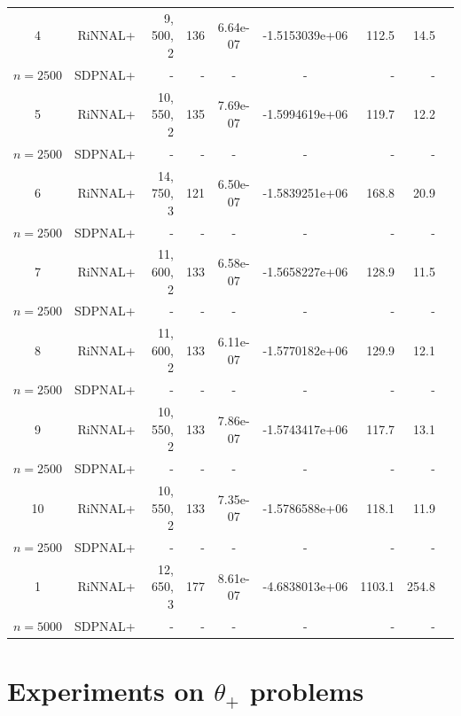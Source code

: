 \documentclass[11pt]{article}
\theoremstyle{plain}
\begin{document}
\begin{footnotesize}
\begin{longtable}[c]{crrrccrrr}
4& RiNNAL+ & 9, 500, 2 & 136 & 6.64e-07 & -1.5153039e+06 & 112.5 &14.5 \\ 
$n=2500$ & SDPNAL+ & - & - & - & - & - & - \\ [3pt] 

5& RiNNAL+ & 10, 550, 2 & 135 & 7.69e-07 & -1.5994619e+06 & 119.7 &12.2 \\ 
$n=2500$ & SDPNAL+ & - & - & - & - & - & - \\ [3pt] 

6& RiNNAL+ & 14, 750, 3 & 121 & 6.50e-07 & -1.5839251e+06 & 168.8 &20.9 \\ 
$n=2500$ & SDPNAL+ & - & - & - & - & - & - \\ [3pt] 

7& RiNNAL+ & 11, 600, 2 & 133 & 6.58e-07 & -1.5658227e+06 & 128.9 &11.5 \\ 
$n=2500$ & SDPNAL+ & - & - & - & - & - & - \\ [3pt] 

8& RiNNAL+ & 11, 600, 2 & 133 & 6.11e-07 & -1.5770182e+06 & 129.9 &12.1 \\ 
$n=2500$ & SDPNAL+ & - & - & - & - & - & - \\ [3pt] 

9& RiNNAL+ & 10, 550, 2 & 133 & 7.86e-07 & -1.5743417e+06 & 117.7 &13.1 \\ 
$n=2500$ & SDPNAL+ & - & - & - & - & - & - \\ [3pt] 

10& RiNNAL+ & 10, 550, 2 & 133 & 7.35e-07 & -1.5786588e+06 & 118.1 &11.9 \\ 
$n=2500$ & SDPNAL+ & - & - & - & - & - & - \\ [3pt] 

1& RiNNAL+ & 12, 650, 3 & 177 & 8.61e-07 & -4.6838013e+06 & 1103.1 &254.8 \\ 
$n=5000$ & SDPNAL+ & - & - & - & - & - & - \\ [3pt] 


\end{longtable}
\end{footnotesize}



\section{Experiments on \texorpdfstring{$\theta_+$}{theta} problems}
\label{appendix-theta}
\end{document}
